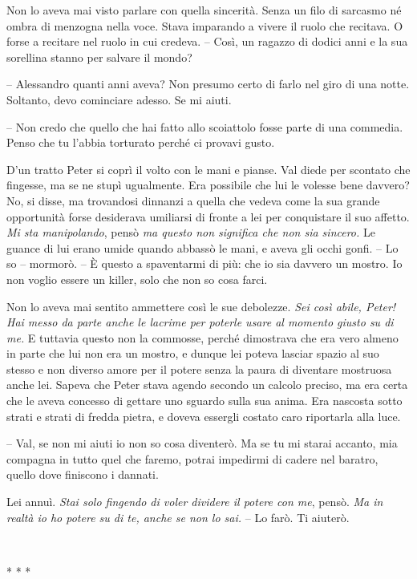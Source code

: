 {Non lo aveva mai visto parlare con quella sincerità. Senza un filo di
	sarcasmo né ombra di menzogna nella voce. Stava imparando a vivere il
	ruolo che recitava. O forse a recitare nel ruolo in cui credeva. --
	Così, un ragazzo di dodici anni e la sua sorellina stanno per salvare il
	mondo?}

{-- Alessandro quanti anni aveva? Non presumo certo di farlo nel giro di
	una notte. Soltanto, devo cominciare adesso. Se mi aiuti.}

{-- Non credo che quello che hai fatto allo scoiattolo fosse parte di
	una commedia. Penso che tu l'abbia torturato perché ci provavi gusto.}

{D'un tratto Peter si coprì il volto con le mani e pianse. Val diede per
	scontato che fingesse, ma se ne stupì ugualmente. Era possibile che lui
	le volesse bene davvero? No, si disse, ma trovandosi dinnanzi a quella
	che vedeva come la sua grande opportunità forse desiderava umiliarsi di
	fronte a lei per conquistare il suo affetto. \emph{Mi sta manipolando},
	\emph{} pensò \emph{ma questo non significa che non sia sincero.} Le
	guance di lui erano umide quando abbassò le mani, e aveva gli occhi
	gonfi. -- Lo so -- mormorò. -- È questo a spaventarmi di più: che io sia
	davvero un mostro. Io non voglio essere un killer, solo che non so cosa
	farci.}

{Non lo aveva mai sentito ammettere così le sue debolezze. \emph{Sei
		così abile, Peter! Hai messo da parte anche le lacrime per poterle usare
		al momento giusto su di me.} E tuttavia questo non la commosse, perché
	dimostrava che era vero almeno in parte che lui non era un mostro, e
	dunque lei poteva lasciar spazio al suo stesso e non diverso amore per
	il potere senza la paura di diventare mostruosa anche lei. Sapeva che
	Peter stava agendo secondo un calcolo preciso, ma era certa che le aveva
	concesso di gettare uno sguardo sulla sua anima. Era nascosta sotto
	strati e strati di fredda pietra, e doveva essergli costato caro
	riportarla alla luce.}

{-- Val, se non mi aiuti io non so cosa diventerò. Ma se tu mi starai
	accanto, mia compagna in tutto quel che faremo, potrai impedirmi di
	cadere nel baratro, quello dove finiscono i dannati.}

{Lei annuì. \emph{Stai solo fingendo di voler dividere il potere con
		me}, \emph{} pensò. \emph{Ma in realtà io ho potere su di te, anche se
		non lo sai.} -- Lo farò. Ti aiuterò.}

{~}

\begin{center}
	{* * *}
\end{center}

